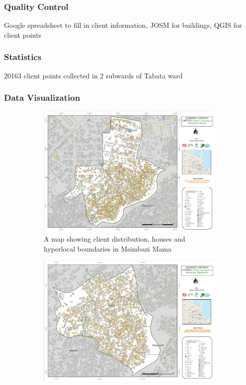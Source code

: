 \documentclass[a4paper,12pt,twoside]{article}
\begin{document}
\subsubsection{Quality Control}
Google spreadsheet to fill in client information, JOSM for buildings, QGIS for client points

\subsubsection{Statistics}
20163 client points collected in 2 subwards of Tabata ward

\newpage

\subsubsection{Data Visualization}
\begin{figure}
  \begin{subfigure}[b]{0.5\textwidth}
    \includegraphics[width=\textwidth]{images/Msimbazi_mama.png}
   \color{RHgreen}\caption{A map showing client distribution, houses and hyperlocal boundaries in Msimbazi Mama}
    \label{fig:1}
  \end{subfigure}
  \begin{subfigure}[b]{0.5\textwidth}
    \includegraphics[width=\textwidth]{images/Msimbazi_magharibi.png}

\end{subfigure}
\end{figure}
\end{document}
